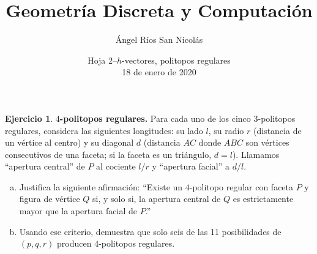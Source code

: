 \documentclass[10pt]{article}
\author{Ángel Ríos San Nicolás}
\title{Geometría Discreta y Computación}
\date{Hoja 2--$h$-vectores, politopos regulares\\ 18 de enero de 2020}
\theoremstyle{definition}
\newtheorem{ejer}{Ejercicio}
\begin{document}
\maketitle
\begin{ejer}$4$\textbf{-politopos regulares.} Para cada uno de los cinco $3$-politopos regulares, considera las siguientes longitudes: su lado $l$, su radio $r$ (distancia de un vértice al centro) y su diagonal $d$ (distancia $AC$ donde $ABC$ son vértices consecutivos de una faceta; si la faceta es un triángulo, $d=l$).
Llamamos ``apertura central'' de $P$ al cociente $l/r$ y ``apertura facial'' a $d/l$. 
\begin{enumerate}[(a)]
\item Justifica la siguiente afirmación: ``Existe un $4$-politopo regular con faceta $P$ y figura de vértice $Q$ si, y solo si, la apertura central de $Q$ es estrictamente mayor que la apertura facial de $P$.'' 

\item Usando ese criterio, demuestra que solo seis de las 11 posibilidades de $(p,q,r)$ producen $4$-politopos regulares.%
\end{enumerate}
\end{ejer}
\end{document}
